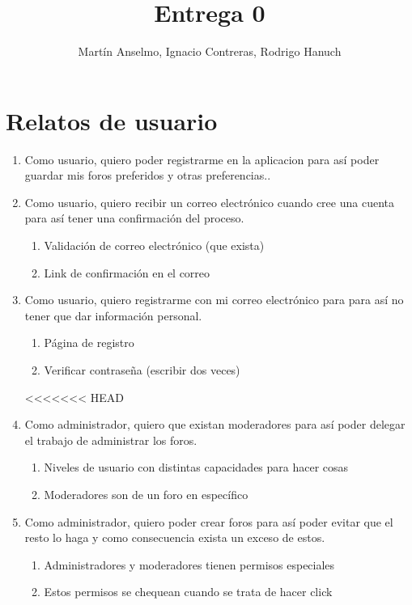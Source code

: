 \documentclass[12pt, letterpaper, notitlepage]{article}
\title{\textbf{Entrega 0}}
\author{Martín Anselmo, Ignacio Contreras, Rodrigo Hanuch}
\begin{document}
	
	\clearpage\maketitle
	\thispagestyle{empty}
	
	\newpage
	
	\section*{Relatos de usuario}
	\newcommand{\story}[3]{Como {#1}, quiero {#2} para {#3}.}
	
	\begin{enumerate}
		
		\item \story{usuario}{poder registrarme en la aplicacion}	
		{así poder guardar mis foros preferidos y otras preferencias.}
		
		
		\item \story{usuario}{recibir un correo electrónico cuando cree una cuenta}	
		{así tener una confirmación del proceso}
		\begin{enumerate}
			\item Validación de correo electrónico (que exista)
			\item Link de confirmación en el correo		
		\end{enumerate}
		
		\item \story{usuario}{registrarme con mi correo electrónico}{para así no tener que 
			dar información personal}
		\begin{enumerate}
			\item Página de registro
			\item Verificar contraseña (escribir dos veces)
		\end{enumerate}
<<<<<<< HEAD


	\item \story{administrador}{que existan moderadores}{así poder delegar el 
		trabajo de administrar los foros}
		\begin{enumerate}
			\item Niveles de usuario con distintas capacidades para hacer cosas
			\item Moderadores son de un foro en específico
		\end{enumerate}
		
		\item \story{administrador}{poder crear foros}{así poder evitar que el resto lo haga y como consecuencia exista un exceso de estos}
		\begin{enumerate}
			\item Administradores y moderadores tienen permisos especiales
			\item Estos permisos se chequean cuando se trata de hacer click
		\end{enumerate}
		

\end{enumerate}
\end{document}
